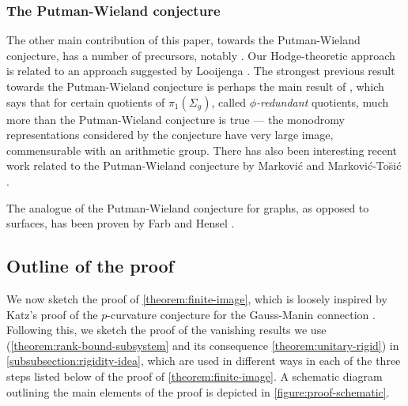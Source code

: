 \documentclass[12 pt]{amsart}
\theoremstyle{plain}
\theoremstyle{definition}
\theoremstyle{remark}
\numberwithin{equation}{section}
\begin{document}
\subsubsection{The Putman-Wieland conjecture} The other main contribution of
\label{subsubsection:prior-putman-wieland}
this paper, towards the Putman-Wieland conjecture, has a number of precursors,
notably \cite{looijenga:prym-representations,grunewald2015arithmetic, looijenga2021arithmetic}.
Our Hodge-theoretic approach is related to an approach suggested by Looijenga \cite{looiejenga:AG}. 
The strongest previous result towards the Putman-Wieland conjecture is perhaps 
the main result of \cite{grunewald2015arithmetic}, which says that for certain quotients of $\pi_1(\Sigma_g)$, 
called \emph{$\phi$-redundant} quotients,
much more than the Putman-Wieland conjecture is true --- the monodromy representations considered by the conjecture have very large image, commensurable with an arithmetic group. There has also been interesting recent work related to the Putman-Wieland conjecture by Markovi\'c and Markovi\'c-To\u{s}i\'c \cite{markovic, markovic2}.

The analogue of the Putman-Wieland conjecture for graphs, as opposed to surfaces, has been proven by Farb and Hensel \cite{farb2017moving}.


\subsection{Outline of the proof}\label{subsection:outline-of-proof}
We now sketch the proof of \autoref{theorem:finite-image}, which is loosely inspired by Katz's proof of the $p$-curvature conjecture for the Gauss-Manin connection \cite{katz:pcurvature-and-hodge}.
Following this, we sketch the proof of the vanishing results we use (\autoref{theorem:rank-bound-subsystem} and its consequence \autoref{theorem:unitary-rigid}) in
\autoref{subsubsection:rigidity-idea}, which are used in different ways in each of the three steps listed below of the proof of \autoref{theorem:finite-image}.
A schematic diagram outlining the main elements of the proof is depicted in
\autoref{figure:proof-schematic}.
\end{document}
